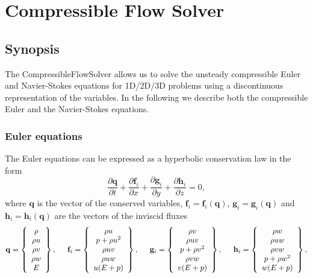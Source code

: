 \chapter{Compressible Flow Solver}

\section{Synopsis}
The CompressibleFlowSolver allows us to solve
the unsteady compressible Euler and Navier-Stokes 
equations for 1D/2D/3D problems using a discontinuous 
representation of the variables. In the following we describe 
both the compressible Euler and the Navier-Stokes equations.

\subsection{Euler equations}
The Euler equations can be expressed as a hyperbolic 
conservation law in the form 
\begin{equation}\label{eq:euler}
\frac{\partial \mathbf{q} }{\partial t} + \frac{\partial \mathbf{f}_i}{\partial x} 
+ \frac{\partial \mathbf{g}_i}{\partial y} +  
\frac{\partial \mathbf{h}_i}{\partial z} = 0,
\end{equation}
where $\mathbf{q} $ is the vector of the conserved variables, 
$\mathbf{f}_i =  \mathbf{f}_i (\mathbf{q})$, $\mathbf{g}_i 
= \mathbf{g}_i (\mathbf{q})$ and $\mathbf{h}_i = 
\mathbf{h}_i (\mathbf{q})$ are  the vectors of the 
inviscid fluxes
\begin{equation}
\mathbf{q} =\left\{
\begin{array}{c}
\rho \\
\rho u \\
\rho v \\ 
\rho w \\
E
\end{array} \right\}, \hspace{0.5 cm}
\mathbf{f}_i =\left\{
\begin{array}{c}
\rho u \\
p + \rho u^2 \\
\rho u v \\ 
\rho u w \\
u (E + p)
\end{array} \right\}, \hspace{0.5 cm}
\mathbf{g}_i =\left\{
\begin{array}{c}
\rho v \\
\rho u v \\
p + \rho v^2 \\ 
\rho v w \\
v (E + p)
\end{array} \right\}, \hspace{0.5 cm}
\mathbf{h}_i =\left\{
\begin{array}{c}
\rho w \\
\rho u w \\
\rho v w \\ 
p + \rho w^2 \\
w (E + p)
\end{array} \right\},
\label{Euler}
\end{equation}
